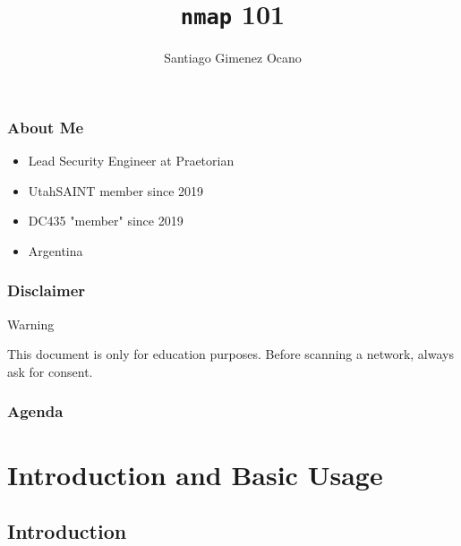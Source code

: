 \documentclass[aspectratio=169,xcolor=dvipsnames]{beamer}
\title{\texttt{nmap} 101}
\author{Santiago Gimenez Ocano}
\date{}
\begin{document}
\begin{frame}
    \titlepage
\end{frame}

\begin{frame}
    \frametitle{About Me}

    \begin{itemize}
        \item Lead Security Engineer at Praetorian
        \item UtahSAINT member since 2019
        \item DC435 "member" since 2019
        \item Argentina
    \end{itemize}

\end{frame}

\begin{frame}
    \frametitle{Disclaimer}
    
    \begin{alertblock}{Warning}
        \begin{center}
            This document is only for education purposes. Before scanning a network, always ask for consent.
        \end{center}
    \end{alertblock}

\end{frame}

\begin{frame}
    \frametitle{Agenda}
    \tableofcontents
\end{frame}

\section{Introduction and Basic Usage}

\subsection{Introduction}
\end{document}
